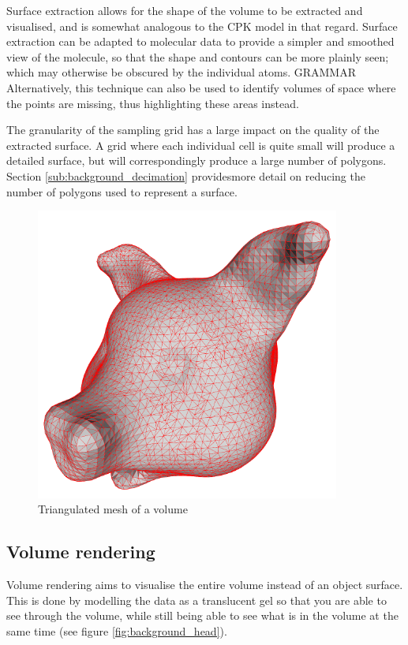 Surface extraction allows for the shape of the volume to be extracted and
visualised, and is somewhat analogous to the CPK model in that regard.
Surface extraction can be adapted to molecular data to provide a simpler and
smoothed view of the molecule, so that the shape and contours can be more
plainly seen; which may otherwise be obscured by the individual atoms.
GRAMMAR
Alternatively, this technique can also be used to identify volumes of space
where the points are missing, thus highlighting these areas instead.

The granularity of the sampling grid has a large impact on the quality of the
extracted surface. A grid where each individual cell is quite small will
produce a detailed surface, but will correspondingly produce a large number of
polygons. Section \ref{sub:background_decimation} providesmore detail on
reducing the number of polygons used to represent a surface.

\begin{figure}[h!]
  \begin{center}
    \includegraphics[width=100mm]{triangulated_mesh}
  \end{center}
  \caption{Triangulated mesh of a volume}
  \label{fig:background_mesh}
\end{figure}


\subsection{Volume rendering}
\label{sub:background_volume}

Volume rendering aims to visualise the entire volume instead of an object
surface. This is done by modelling the data as a translucent gel so that you
are able to see through the volume, while still being able to see what is in
the volume at the same time (see figure \ref{fig:background_head}).

